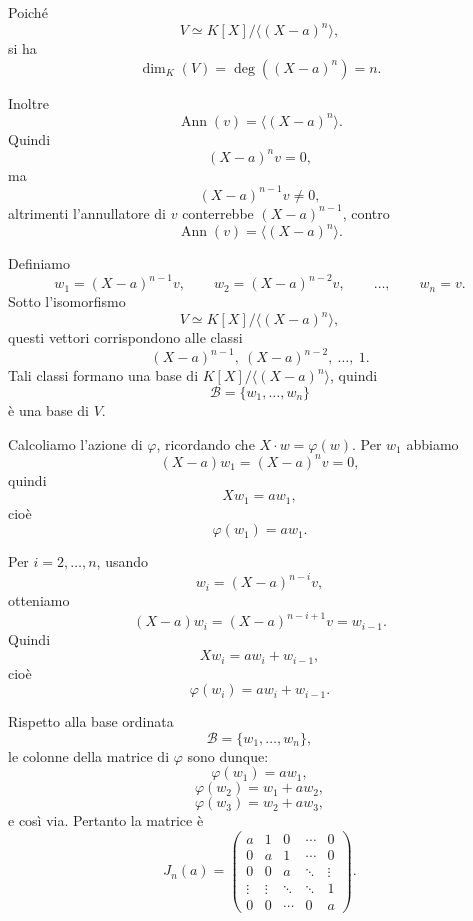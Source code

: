 \documentclass[a4paper]{article}
\begin{document}
\begin{radioactive}
\begin{snippetproof}{}
    Poiché
    \[
        V\simeq K[X]/\langle (X-a)^n \rangle,
    \]
    si ha
    \[
        \dim_K(V)=\deg((X-a)^n)=n.
    \]

    Inoltre
    \[
        \operatorname{Ann}(v)=\langle (X-a)^n \rangle.
    \]
    Quindi
    \[
        (X-a)^n v=0,
    \]
    ma
    \[
        (X-a)^{n-1}v\neq 0,
    \]
    altrimenti l'annullatore di \(v\) conterrebbe \((X-a)^{n-1}\), contro
    \[
        \operatorname{Ann}(v)=\langle (X-a)^n \rangle.
    \]

    Definiamo
    \[
        w_1=(X-a)^{n-1}v,
        \qquad
        w_2=(X-a)^{n-2}v,
        \qquad
        \ldots,
        \qquad
        w_n=v.
    \]
    Sotto l'isomorfismo
    \[
        V\simeq K[X]/\langle (X-a)^n \rangle,
    \]
    questi vettori corrispondono alle classi
    \[
        (X-a)^{n-1},\ (X-a)^{n-2},\ \ldots,\ 1.
    \]
    Tali classi formano una base di \(K[X]/\langle (X-a)^n \rangle\), quindi
    \[
        \mathcal{B}=\{w_1,\ldots,w_n\}
    \]
    è una base di \(V\).

    Calcoliamo l'azione di \(\varphi\), ricordando che \(X\cdot w=\varphi(w)\).
    Per \(w_1\) abbiamo
    \[
        (X-a)w_1=(X-a)^n v=0,
    \]
    quindi
    \[
        Xw_1=aw_1,
    \]
    cioè
    \[
        \varphi(w_1)=aw_1.
    \]

    Per \(i=2,\ldots,n\), usando
    \[
        w_i=(X-a)^{n-i}v,
    \]
    otteniamo
    \[
        (X-a)w_i=(X-a)^{n-i+1}v=w_{i-1}.
    \]
    Quindi
    \[
        Xw_i=aw_i+w_{i-1},
    \]
    cioè
    \[
        \varphi(w_i)=aw_i+w_{i-1}.
    \]

    Rispetto alla base ordinata
    \[
        \mathcal{B}=\{w_1,\ldots,w_n\},
    \]
    le colonne della matrice di \(\varphi\) sono dunque:
    \[
        \varphi(w_1)=aw_1,
    \]
    \[
        \varphi(w_2)=w_1+aw_2,
    \]
    \[
        \varphi(w_3)=w_2+aw_3,
    \]
    e così via. Pertanto la matrice è
    \[
        J_n(a)
        =
        \begin{pmatrix}
            a & 1 & 0 & \cdots & 0\\
            0 & a & 1 & \cdots & 0\\
            0 & 0 & a & \ddots & \vdots\\
            \vdots & \vdots & \ddots & \ddots & 1\\
            0 & 0 & \cdots & 0 & a
        \end{pmatrix}.
    \]
\end{snippetproof}
\end{radioactive}
\end{document}
